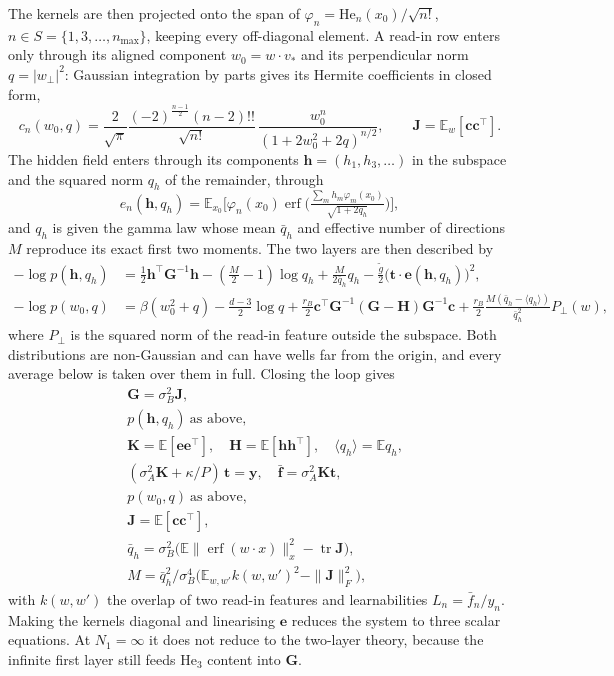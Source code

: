 \documentclass[11pt,a4paper]{article}
\newcommand{\E}{\mathbb{E}}
\newcommand{\erf}{\operatorname{erf}}
\newcommand{\He}{\mathrm{He}}
\begin{document}
The kernels are then projected onto the span of $\varphi_n=\He_n(x_0)/\sqrt{n!}$, $n\in S=\{1,3,\dots,n_{\max}\}$, keeping
every off-diagonal element. A read-in row enters only through its aligned component $w_0=w\cdot v_*$ and its
perpendicular norm $q=|w_\perp|^2$: Gaussian integration by parts gives its Hermite coefficients in closed form,
\begin{equation}
  c_n(w_0,q)=\frac{2}{\sqrt\pi}\frac{(-2)^{\frac{n-1}{2}}(n-2)!!}{\sqrt{n!}}\,\frac{w_0^n}{(1+2w_0^2+2q)^{n/2}},
  \qquad \mathbf J=\E_w[\mathbf c\mathbf c^\top].
\end{equation}
The hidden field enters through its components $\mathbf h=(h_1,h_3,\dots)$ in the subspace and the squared norm $q_h$ of
the remainder, through
\begin{equation}
  e_n(\mathbf h,q_h)=\E_{x_0}\Big[\varphi_n(x_0)\erf\Big(\tfrac{\sum_m h_m\varphi_m(x_0)}{\sqrt{1+2q_h}}\Big)\Big],
\end{equation}
and $q_h$ is given the gamma law whose mean $\bar q_h$ and effective number of directions $M$ reproduce its exact first two
moments. The two layers are then described by
\begin{align}
  -\log p(\mathbf h,q_h)&=\tfrac12\mathbf h^\top\mathbf G^{-1}\mathbf h-(\tfrac M2-1)\log q_h+\tfrac{M}{2\bar q_h}q_h-\tfrac{\tilde g}{2}\big(\mathbf t\cdot\mathbf e(\mathbf h,q_h)\big)^2,\\
  -\log p(w_0,q)&=\beta(w_0^2+q)-\tfrac{d-3}{2}\log q+\tfrac{r_B}{2}\mathbf c^\top\mathbf G^{-1}(\mathbf G-\mathbf H)\mathbf G^{-1}\mathbf c
  +\tfrac{r_B}{2}\tfrac{M(\bar q_h-\langle q_h\rangle)}{\bar q_h^2}P_\perp(w),
\end{align}
where $P_\perp$ is the squared norm of the read-in feature outside the subspace. Both distributions are non-Gaussian and
can have wells far from the origin, and every average below is taken over them in full. Closing the loop gives
\begin{align}
  &\mathbf G=\sigma_B^2\mathbf J, \tag{E1}\\
  &p(\mathbf h,q_h)\ \text{as above}, \tag{E2}\\
  &\mathbf K=\E[\mathbf e\mathbf e^\top],\quad \mathbf H=\E[\mathbf h\mathbf h^\top],\quad \langle q_h\rangle=\E q_h, \tag{E3}\\
  &(\sigma_A^2\mathbf K+\kappa/P)\,\mathbf t=\mathbf y,\quad \bar{\mathbf f}=\sigma_A^2\mathbf K\mathbf t, \tag{E4}\\
  &p(w_0,q)\ \text{as above}, \tag{E5}\\
  &\mathbf J=\E[\mathbf c\mathbf c^\top], \tag{E6}\\
  &\bar q_h=\sigma_B^2\big(\E\|\erf(w\cdot x)\|_x^2-\operatorname{tr}\mathbf J\big), \tag{E7}\\
  &M=\bar q_h^2\big/\sigma_B^4\big(\E_{w,w'}k(w,w')^2-\|\mathbf J\|_F^2\big), \tag{E8}
\end{align}
with $k(w,w')$ the overlap of two read-in features and learnabilities $L_n=\bar f_n/y_n$. Making the kernels diagonal
and linearising $\mathbf e$ reduces the system to three scalar equations. At $N_1=\infty$ it does not reduce to the
two-layer theory, because the infinite first layer still feeds He$_3$ content into $\mathbf G$.
\end{document}
